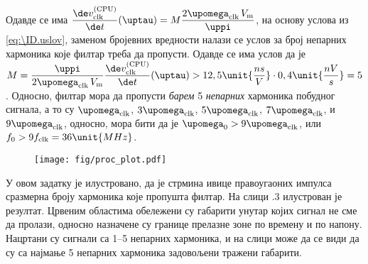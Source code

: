     
    Одавде се има 
    $\dfrac{\de v_{\rm clk}^{\rm (CPU)}}{\de t} (\uptau)
    = 
    M
    \dfrac{ 2
        \upomega_{\rm clk} \, 
        V_{\rm m} }{\uppi} 
    $, на основу услова из \eqref{eq:\ID.uslov}, заменом бројевних вредности налази се услов 
    за број непарних хармоника које филтар треба да пропусти. Одавде се има услов да је 
    $M = 
    \dfrac{\uppi} { 2
        \upomega_{\rm clk} \, 
        V_{\rm m} } 
    \dfrac{\de v_{\rm clk}^{\rm (CPU)}}{\de t} (\uptau)
    > 12,5 \unit{\dfrac{ns}{V}} \cdot 0,4 \unit{\dfrac{nV}{s}} = 5$. Односно, филтар мора да пропусти
    \textit{барем} 5 \textit{непарних} хармоника побудног сигнала, а то су
    $\upomega_{\rm clk}$, $3\upomega_{\rm clk}$, $5\upomega_{\rm clk}$, $7\upomega_{\rm clk}$, и
    $9\upomega_{\rm clk}$, односно, мора бити да је 
    $\upomega_0 > 9\upomega_{\rm clk}$, или 
    $f_0 > 9f_{\rm clk} = 36\unit{MHz}$.    
 
    \begin{figure}[ht!]
        \centering
        \texttt{[image: fig/proc\_plot.pdf]} 
        \caption{}
    \end{figure}
    
    У овом задатку је илустровано, да је стрмина ивице правоугаоних импулса сразмерна
    броју хармоника које пропушта филтар. На слици \ID.3 илустрован је резултат. 
    Црвеним областима обележени су габарити унутар којих сигнал не сме да пролази, 
    односно назначене су границе прелазне зоне по времену и по напону. Нацртани су сигнали 
    са 1--5 непарних хармоника, и на слици може да се види да су са најмање 5
    непарних хармоника задовољени
    тражени габарити. 

  